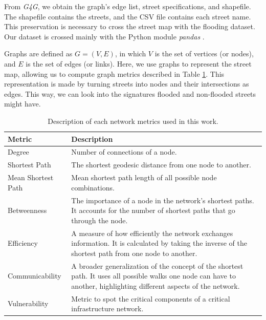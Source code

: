 \documentclass[sn-nature]{sn-jnl}%
\theoremstyle{thmstyleone}%
\theoremstyle{thmstyletwo}%
\theoremstyle{thmstylethree}%
\begin{document}
From \textit{G4G}, we obtain the graph's edge list, street specifications, and shapefile. The shapefile contains the streets, and the CSV file contains each street name. This preservation is necessary to cross the street map with the flooding dataset. Our dataset is crossed mainly with the Python module \textit{pandas} \cite{reback2020pandas}. 

Graphs are defined as $G = (V,E)$, in which $V$ is the set of vertices (or nodes), and $E$ is the set of edges (or links). Here, we use graphs to represent the street map, allowing us to compute graph metrics described in Table \ref{tab:metrics}. This representation is made by turning streets into nodes and their intersections as edges. This way, we can look into the signatures flooded and non-flooded streets might have.


\begin{table}[H]
    \centering
    \caption{Description of each network metrics used in this work.}
    \begin{tabularx}{\textwidth}{X|X}
         \hline
         \textbf{Metric} & \textbf{Description} \\
         \hline
         Degree & Number of connections of a node. \\
         \hline
         Shortest Path & The shortest geodesic distance from one node to another.\\
         \hline
         Mean Shortest Path & Mean shortest path length of all possible node combinations.\\
         \hline
         Betweenness & The importance of a node in the network's shortest paths. It accounts for the number of shortest paths that go through the node.\\
         \hline
         Efficiency \cite{Latora2001}&  A measure of how efficiently the network exchanges information. It is calculated by taking the inverse of the shortest path from one node to another.\\
         \hline
         Communicability \cite{Estrada2008} & A broader generalization of the concept of the shortest path. It uses all possible walks one node can have to another, highlighting different aspects of the network.\\
         \hline
         Vulnerability \cite{Latora2004, Goldshtein2004} & Metric to spot the critical components of a critical infrastructure network.
         \\
         \hline
    \end{tabularx}
    
    \label{tab:metrics}
\end{table}
\end{document}
